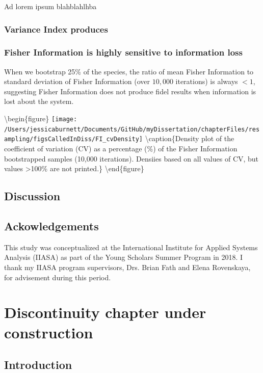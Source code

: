 \documentclass[12pt,twoside,openany]{reedthesis}
\begin{document}
Ad lorem ipsum blahblahlhba

\subsection{Variance Index produces}\label{variance-index-produces}

\subsection{Fisher Information is highly sensitive to information
loss}\label{fisher-information-is-highly-sensitive-to-information-loss}

When we bootstrap 25\% of the species, the ratio of mean Fisher
Information to standard deviation of Fisher Information (over \(10,000\)
iterations) is always \(< 1\), suggesting Fisher Information does not
produce fidel results when information is lost about the system.

\textbackslash{}begin\{figure\}
\texttt{[image: /Users/jessicaburnett/Documents/GitHub/myDissertation/chapterFiles/resampling/figsCalledInDiss/FI\_cvDensity]}
\textbackslash{}caption\{Density plot of the coefficient of variation
(CV) as a percentage (\%) of the Fisher Information bootstrapped samples
(10,000 iterations). Densiies based on all values of CV, but values
\textgreater{}100\% are not printed.\}\label{fig:results}
\textbackslash{}end\{figure\}

\section{Discussion}\label{discussion-3}

\section{Ackowledgements}\label{ackowledgements}

This study was conceptualized at the International Institute for Applied
Systems Analysis (IIASA) as part of the Young Scholars Summer Program in
2018. I thank my IIASA program supervisors, Drs. Brian Fath and Elena
Rovenskaya, for advisement during this period.

\chapter{Discontinuity chapter under construction}\label{discontinuity}

\section{Introduction}\label{introduction-5}
\end{document}
